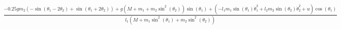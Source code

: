 \documentclass[preview]{standalone}
\begin{document}
\begin{align*}
\frac{- 0.25 g m_{2} \left(- \operatorname{sin}\left(\theta_{1} - 2 \theta_{2}\right) + \operatorname{sin}\left(\theta_{1} + 2 \theta_{2}\right)\right) + g \left(M + m_{1} + m_{2} \operatorname{sin}^{2}\left(\theta_{2}\right)\right) \operatorname{sin}\left(\theta_{1}\right) + \left(- l_{1} m_{1} \operatorname{sin}\left(\theta_{1}\right) \dot{\theta}_{1}^{2} + l_{2} m_{2} \operatorname{sin}\left(\theta_{2}\right) \dot{\theta}_{2}^{2} + u\right) \operatorname{cos}\left(\theta_{1}\right)}{l_{1} \left(M + m_{1} \operatorname{sin}^{2}\left(\theta_{1}\right) + m_{2} \operatorname{sin}^{2}\left(\theta_{2}\right)\right)}
\end{align*}
\end{document}
